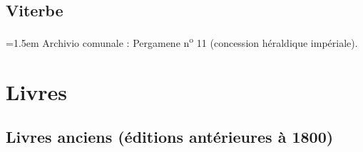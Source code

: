 \documentclass[12pt,twoside,openany]{book}
\newenvironment{PurhBibliography}
  {%
    \par
    \setlength{\parindent}{0pt}%
    \setlength{\leftskip}{0pt}%
  }
  {%
    \par
  }
\begin{document}
\subsection{Viterbe}

\begin{PurhBibliography}
\noindent\hangindent=1.5em Archivio comunale : Pergamene n\textsuperscript{o} 11 (concession héraldique impériale).\par
\end{PurhBibliography}

\section{Livres}

\subsection{Livres anciens (éditions antérieures à 1800)}
\end{document}
